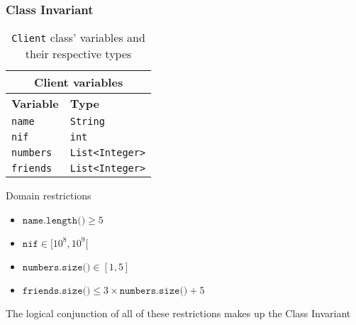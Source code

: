 \subsubsection{Class Invariant}
\label{sec:classes.client.invariant}
\begin{wraptable}{l}{0pt}
  \vspace{-\baselineskip}
  \begin{tabular}{|l|l|}
    \hline
    \multicolumn{2}{|c|}{\textbf{Client variables}} \\ \hline
    \textbf{Variable} & \textbf{Type} \\ \hline
    \texttt{name}         & \texttt{String}        \\ \hline
    \texttt{nif}          & \texttt{int}           \\ \hline
    \texttt{numbers} & \texttt{List<Integer>} \\ \hline
    \texttt{friends}      & \texttt{List<Integer>} \\ \hline
  \end{tabular}
  \caption{\texttt{Client} class' variables and their respective types}
  \label{tab:classes.client.invariant.vars}
  \vspace{-4\baselineskip}
\end{wraptable}

Domain restrictions
\begin{itemize}
  \item $\texttt{name.length()} \ge 5$
  \item $\texttt{nif} \in [10^8,10^9[$
  \item $\texttt{numbers.size()} \in [1,5]$
  \item $\texttt{friends.size()} \le 3 \times \texttt{numbers.size()} + 5 $
\end{itemize}
The logical conjunction of all of these restrictions makes up the Class
Invariant

